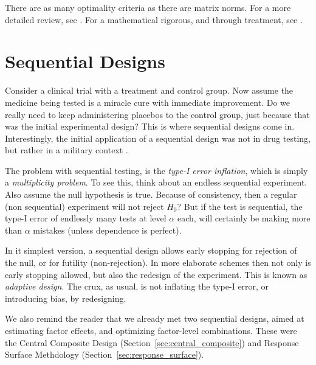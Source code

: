 \begin{extra}
There are as many optimality criteria as there are matrix norms. For a more detailed review, see \cite{wikipedia_optimal_2015}.
For a mathematical rigorous, and through treatment, see \cite{pukelsheim_optimal_1993}.
\end{extra}







\section{Sequential Designs}
\label{sec:sequantial}

Consider a clinical trial with a treatment and control group.
Now assume the medicine being tested is a miracle cure with immediate improvement. 
Do we really need to keep administering placebos to the control group, just because that was the initial experimental design?
This is where sequential designs come in.
Interestingly, the initial application of a sequential design was not in drug testing, but rather in a military context \citep{wald_sequential_1945}.

The problem with sequential testing, is the \emph{type-I error inflation}, which is simply a \emph{multiplicity problem}. 
To see this, think about an endless sequential experiment. Also assume the null hypothesis is true. 
Because of consistency, then a regular (non sequential) experiment will not reject $H_0$?
But if the test is sequential, the type-I error of endlessly many tests at level $\alpha$ each, will certainly be making more than $\alpha$ mistakes (unless dependence is perfect).

In it simplest version, a sequential design allows early stopping for rejection of the null, or for futility (non-rejection). 
In more elaborate schemes then not only is early stopping allowed, but also the redesign of the experiment. 
This is known as \emph{adaptive design}. The crux, as usual, is not inflating the type-I error, or introducing bias, by redesigning.

We also remind the reader that we already met two sequential designs, aimed at estimating factor effects, and optimizing factor-level combinations.
These were the Central Composite Design (Section~\ref{sec:central_composite}) and Response Surface Methdology (Section~\ref{sec:response_surface}).

